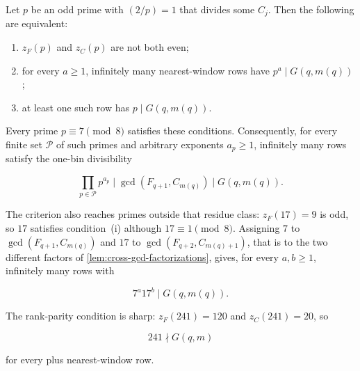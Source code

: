 \begin{theorem}
\label{thm:local-clocks}
Let $p$ be an odd prime with $(2/p)=1$ that divides some $C_j$. Then the
following are equivalent:

\begin{enumerate}[label=\textup{(\roman*)}]
 \item $z_F(p)$ and $z_C(p)$ are not both even;
 \item for every $a\geqslant1$, infinitely many nearest-window rows have
 $p^a\mid G(q,m(q))$;
 \item at least one such row has $p\mid G(q,m(q))$.
\end{enumerate}

Every prime $p\equiv7\pmod8$ satisfies these conditions. Consequently, for
every finite set $\mathcal P$ of such primes and arbitrary exponents
$a_p\geqslant1$, infinitely many rows satisfy the one-bin divisibility

\begin{equation}
 \prod_{p\in\mathcal P}p^{a_p}
 \mid\gcd(F_{q+1},C_{m(q)})
 \mid G(q,m(q)).
 \label{eq:seven-class-product}
\end{equation}

The criterion also reaches primes outside that residue class: $z_F(17)=9$ is
odd, so $17$ satisfies condition~(i) although $17\equiv1\pmod8$. Assigning
$7$ to $\gcd(F_{q+1},C_{m(q)})$ and $17$ to $\gcd(F_{q+2},C_{m(q)+1})$, that
is to the two different factors of
\cref{lem:cross-gcd-factorizations}, gives, for every $a,b\geqslant1$,
infinitely many rows with

\begin{equation}
 7^a17^b\mid G(q,m(q)).
 \label{eq:seven-seventeen}
\end{equation}

The rank-parity condition is sharp: $z_F(241)=120$ and $z_C(241)=20$, so

\begin{equation}
 241\nmid G(q,m)
 \label{eq:241-obstruction}
\end{equation}

for every plus nearest-window row.
\end{theorem}

